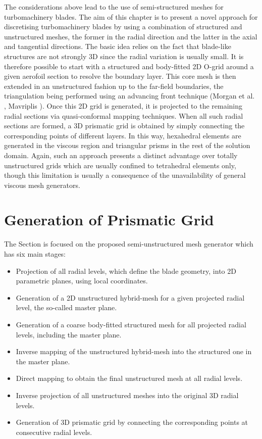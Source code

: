  The considerations above lead to the use of semi-structured meshes
 for turbomachinery blades. The aim of this chapter is to present a
 novel approach for discretising turbomachinery blades by using a combination
 of structured and unstructured meshes, the former in the radial direction
 and the latter in the axial and tangential directions.
 The basic idea relies on the fact that blade-like structures
 are not strongly 3D since the radial variation
 is usually small.
 It is therefore possible to start with a structured
 and body-fitted 2D O-grid around a given aerofoil section
 to resolve the boundary layer.
 This core mesh is then extended in an unstructured
 fashion up to the far-field boundaries,
 the triangulation being performed using an advancing
 front technique (Morgan et al. ,
 Mavriplis ).
 Once this 2D grid is generated, it is projected to the remaining radial
 sections via quasi-conformal mapping techniques.
 When all such radial sections are formed, a 3D
 prismatic grid is obtained by simply connecting the corresponding
 points of different layers. In this way, hexahedral
 elements are generated in the viscous region and
 triangular prisms in the rest of the solution
 domain. Again, such an approach presents a distinct advantage over
 totally unstructured grids which are usually confined to tetrahedral
 elements only, though this limitation is usually a consequence of the
 unavailability of general viscous mesh generators.
%
%
\section{Generation of Prismatic Grid}
\label{generation}
%
 The Section is focused on the proposed semi-unstructured mesh generator
 which has six main stages:

%
\begin{itemize}
 \item Projection of all radial levels, which define the blade geometry,
       into 2D parametric planes, using local
       coordinates.
 \item Generation of a 2D unstructured hybrid-mesh for
       a given projected radial level, the so-called master plane.
 \item Generation of a coarse body-fitted structured mesh for
       all projected radial levels, including the master plane.
 \item Inverse mapping of the unstructured hybrid-mesh
       into the structured one in the master plane.
 \item Direct mapping to obtain the final unstructured mesh at all radial levels.
 \item Inverse projection of all unstructured meshes into the original
       3D radial levels.
 \item Generation of 3D prismatic grid by connecting the corresponding points
       at consecutive radial levels.
\end{itemize}
%
%
